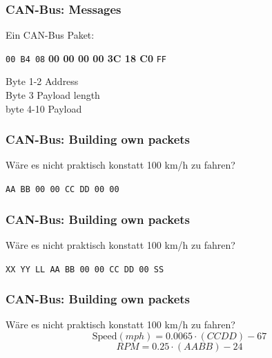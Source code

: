 \documentclass[t]{beamer}
\begin{document}
\begin{frame}
	\frametitle{CAN-Bus: Messages}
    Ein CAN-Bus Paket:
    \newline
    \newline
    \newline
    \newline
{\Large \centerline{\texttt{00 B4 08} \textbf{00 00 00 00 3C 18 C0} \texttt{FF}}}
    \vspace*{1cm}

    Byte 1-2 Address \\
    Byte 3 Payload length \\
    byte 4-10 Payload
\end{frame}


\begin{frame}
	\frametitle{CAN-Bus: Building own packets}
    Wäre es nicht praktisch konstatt 100 km/h zu fahren?
    \newline
    \newline
    {\Large \centerline{\texttt{AA BB 00 00 CC DD 00 00}}}
\end{frame}

\begin{frame}
	\frametitle{CAN-Bus: Building own packets}
    Wäre es nicht praktisch konstatt 100 km/h zu fahren?
    \newline
    \newline
    {\Large \centerline{\texttt{XX YY LL AA BB 00 00 CC DD 00 SS}}}
\end{frame}

\begin{frame}
	\frametitle{CAN-Bus: Building own packets}
    Wäre es nicht praktisch konstatt 100 km/h zu fahren?
    \newline
    \[\text{Speed} (mph) = 0.0065 \cdot (CC DD) - 67\]
    \[RPM = 0.25 \cdot (AA BB) - 24\]
\end{frame}
\end{document}
